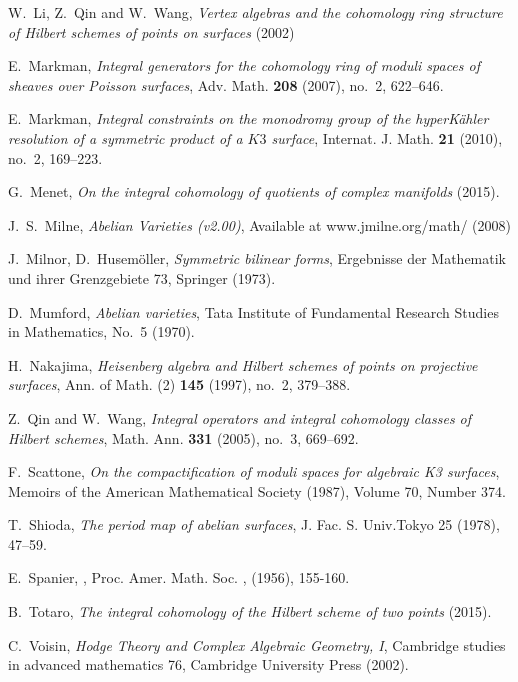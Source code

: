 \begin{thebibliography}{10}
W.~Li, Z.~Qin and W.~Wang, \emph{Vertex algebras and the cohomology ring structure of 
  Hilbert schemes of points on surfaces} (2002)

E.~Markman, \emph{Integral generators for the cohomology ring of moduli spaces of
  sheaves over Poisson surfaces}, Adv. Math. \textbf{208} (2007), no.~2,
  622--646.

E.~Markman, \emph{Integral constraints on the monodromy group of the
  hyper{K}\"ahler resolution of a symmetric product of a {$K3$} surface},
  Internat. J. Math. \textbf{21} (2010), no.~2, 169--223.

G.~Menet, \emph{On the integral cohomology of quotients of complex manifolds} (2015).

J.~S.~Milne, \emph{Abelian Varieties (v2.00)}, Available at www.jmilne.org/math/ (2008)  

J.~Milnor, D.~Husem\"oller, \emph{Symmetric bilinear forms}, Ergebnisse der Mathematik
  und ihrer Grenzgebiete 73, Springer (1973).

D.~Mumford, \emph{Abelian varieties}, Tata Institute of Fundamental Research Studies in Mathematics, 
  No.~5 (1970).

H.~Nakajima, \emph{Heisenberg algebra and Hilbert schemes of points on
  projective surfaces}, Ann. of Math. (2) \textbf{145} (1997), no.~2, 379--388.

Z.~Qin and W.~Wang, \emph{Integral operators and integral cohomology classes of
  {H}ilbert schemes}, Math. Ann. \textbf{331} (2005), no.~3, 669--692.

F.~Scattone, \emph{On the compactification of moduli spaces for algebraic K3 surfaces},
  Memoirs of the American Mathematical Society (1987), Volume 70, Number 374.

T.~Shioda, \emph{The period map of abelian surfaces}, J. Fac. S. Univ.Tokyo 25 (1978), 47--59.

E.~Spanier, 
,
\newblock Proc. Amer. Math. Soc.
, (1956), 155-160.

B.~Totaro, \emph{The integral cohomology of the Hilbert scheme of two points} (2015).

C.~Voisin, \emph{Hodge Theory and Complex Algebraic Geometry, I},
  Cambridge studies in advanced mathematics 76, Cambridge University Press (2002).

\end{thebibliography}